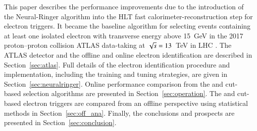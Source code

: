This paper describes the performance improvements due to the introduction of the Neural-Ringer algorithm into the HLT fast calorimeter-reconstruction step for electron triggers. It became the baseline algorithm for selecting events containing at least one isolated electron with transverse energy above 15~GeV in the 2017 proton--proton collision ATLAS data-taking at $\sqrt{s} = 13$~TeV in LHC \RunTwo. 
The ATLAS detector and the offline and online electron identification are described in Section~\ref{sec:atlas}. Full details of the \rnn electron identification procedure and implementation, including the training and tuning strategies, are given in Section~\ref{sec:neuralringer}. Online performance comparison from the \rnn and cut-based selection algorithms are presented in Section~\ref{sec:operation}. The \rnn and cut-based electron triggers are compared from an offline perspective using statistical methods in Section~\ref{sec:off_ana}. Finally, the conclusions and prospects are presented in Section~\ref{sec:conclusion}.

